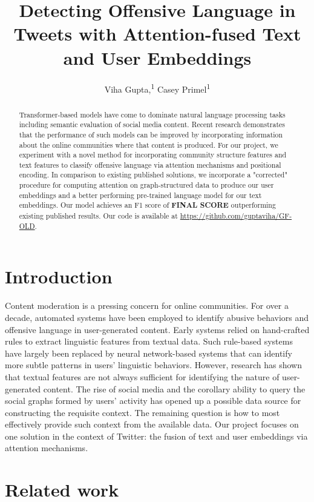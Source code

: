 \documentclass[letterpaper]{article} %
\title{Detecting Offensive Language in Tweets with Attention-fused Text and User Embeddings}
\author {
    Viha Gupta,\textsuperscript{\rm 1}
    Casey Primel\textsuperscript{\rm 1}
}
\begin{document}
\maketitle

\begin{abstract}
    Transformer-based models have come to dominate natural language processing tasks including semantic evaluation of social media content. Recent research demonstrates that the performance of such models can be improved by incorporating information about the online communities where that content is produced. For our project, we experiment with a novel method for incorporating community structure features  and text features to classify offensive language via attention mechanisms and positional encoding. In comparison to existing published solutions, we incorporate a "corrected" procedure for computing attention on graph-structured data to produce our user embeddings and a better performing pre-trained language model for our text embeddings. Our model achieves an F1 score of \textbf{FINAL SCORE} outperforming existing published results. Our code is available at \url{https://github.com/guptaviha/GF-OLD}.
\end{abstract}

\section{Introduction}

Content moderation is a pressing concern for online communities. For over a decade, automated systems have been employed to identify abusive behaviors and offensive language in user-generated content. Early systems relied on hand-crafted rules to extract linguistic features from textual data. Such rule-based systems have largely been replaced by neural network-based systems that can identify more subtle patterns in users' linguistic behaviors. However, research has shown that textual features are not always sufficient for identifying the nature of user-generated content. The rise of social media and the corollary ability to query the social graphs formed by users' activity has opened up a possible data source for constructing the requisite context. The remaining question is how to most effectively provide such context from the available data. Our project focuses on one solution in the context of Twitter: the fusion of text and user embeddings via attention mechanisms.

\section{Related work}
\end{document}
